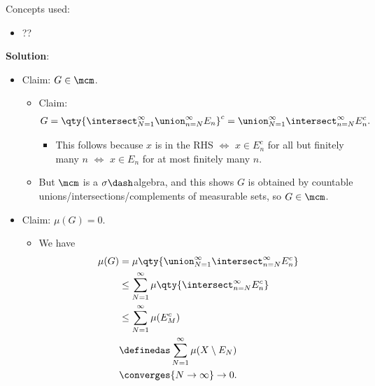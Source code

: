 \begin{solution}

Concepts used:

\begin{itemize}
\tightlist
\item
  ??
\end{itemize}

\textbf{Solution}:

\begin{itemize}
\item
  Claim: \(G\in \mcm\).

  \begin{itemize}
  \item
    Claim:
    \begin{align*}  
    G = \qty{ \intersect_{N=1}^\infty \union_{n=N}^\infty E_n}^c = \union_{N=1}^\infty \intersect_{n=N}^\infty E_n^c
    .\end{align*}

    \begin{itemize}
    \tightlist
    \item
      This follows because \(x\) is in the RHS \(\iff\) \(x\in E_n^c\)
      for all but finitely many \(n\) \(\iff\) \(x\in E_n\) for at most
      finitely many \(n\).
    \end{itemize}
  \item
    But \(\mcm\) is a \(\sigma\dash\)algebra, and this shows \(G\) is
    obtained by countable unions/intersections/complements of measurable
    sets, so \(G\in \mcm\).
  \end{itemize}
\item
  Claim: \(\mu(G) = 0\).

  \begin{itemize}
  \tightlist
  \item
    We have
    \begin{align*}  
    \mu(G)
    &= \mu\qty{\union_{N=1}^\infty \intersect_{n=N}^\infty E_n^c} \\
    &\leq \sum_{N=1}^\infty \mu \qty{\intersect_{n=N}^\infty E_n^c}  \\
    &\leq \sum_{N=1}^\infty \mu(E_M^c) \\ 
    &\definedas \sum_{N=1}^\infty \mu(X\setminus E_N) \\
    &\converges{N\to\infty}\to 0
    .\end{align*}
  \end{itemize}
\end{itemize}


\end{solution}

